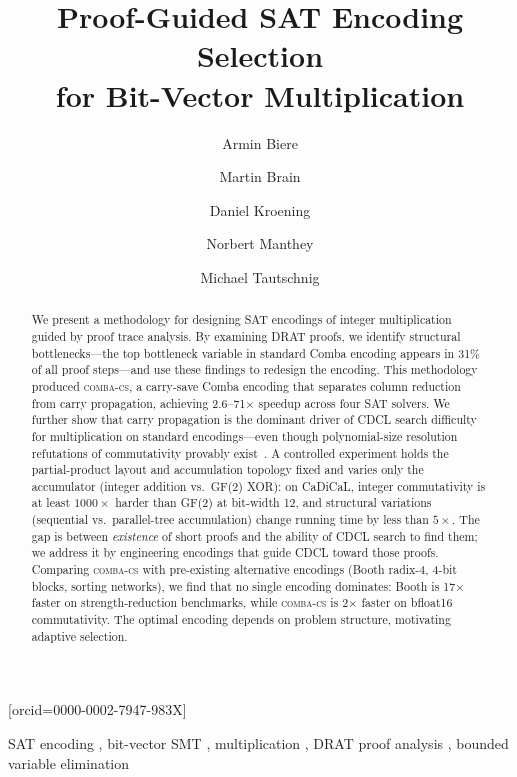 \documentclass[a4paper]{ceurart}
\newcommand{\combacs}{\textsc{comba-cs}\xspace}
\begin{document}

\title{Proof-Guided SAT Encoding Selection\\for Bit-Vector Multiplication}

\author[1,2]{Armin Biere}
\author[3]{Martin Brain}
\author[1]{Daniel Kroening}
\author[1]{Norbert Manthey}
\author[1,4]{Michael Tautschnig}[orcid=0000-0002-7947-983X]
\address[1]{Amazon Web Services}
\address[2]{University of Freiburg, Germany}
\address[3]{City St George's, University of London, United Kingdom}
\address[4]{Queen Mary University of London, United Kingdom}

\begin{abstract}
We present a methodology for designing SAT encodings of integer
multiplication guided by proof trace analysis. By examining DRAT
proofs, we identify structural bottlenecks---the top bottleneck
variable in standard Comba encoding appears in 31\% of all proof
steps---and use these findings to redesign the encoding. This
methodology produced \combacs, a carry-save Comba encoding that
separates column reduction from carry propagation, achieving
2.6--71$\times$ speedup across four SAT solvers. We further show
that carry propagation is the dominant driver of CDCL search
difficulty for multiplication on standard encodings---even though
polynomial-size resolution refutations of commutativity provably
exist~\cite{beame2019toward}. A controlled experiment holds the
partial-product layout and accumulation
topology fixed and varies only the accumulator (integer addition
vs.\ GF(2) XOR): on CaDiCaL, integer commutativity is at least
$1000\times$ harder than GF(2) at bit-width 12, and structural
variations (sequential vs.\ parallel-tree accumulation) change
running time by less than $5\times$. The gap is between
\emph{existence} of short proofs and the ability of CDCL
search to find them; we address it by engineering encodings
that guide CDCL toward those proofs. Comparing \combacs with pre-existing alternative
encodings (Booth radix-4, 4-bit blocks, sorting networks), we
find that no single encoding dominates: Booth is 17$\times$ faster
on strength-reduction benchmarks, while \combacs is 2$\times$
faster on bfloat16 commutativity. The optimal encoding depends on
problem structure, motivating adaptive selection.
\end{abstract}

\begin{keywords}
SAT encoding \sep
bit-vector SMT \sep
multiplication \sep
DRAT proof analysis \sep
bounded variable elimination
\end{keywords}
\end{document}
